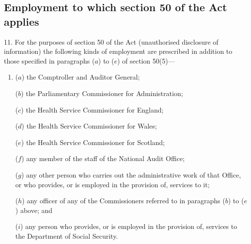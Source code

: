 \documentclass[a4paper,12pt]{article}
\begin{document}
%
%
%

\subsection[11. Employment to which section 50 of the Act applies]{Employment to which section 50 of the Act applies}

11.  For the purposes of section 50 of the Act (unauthorised disclosure of information) the following kinds of employment are prescribed in addition to those specified in paragraphs ($a$) to ($e$) of section 50(5)—
\begin{enumerate}\item[]
($a$) the Comptroller and Auditor General;

($b$) the Parliamentary Commissioner for Administration;

($c$) the Health Service Commissioner for England;

($d$) the Health Service Commissioner for Wales;

($e$) the Health Service Commissioner for Scotland;

($f$) any member of the staff of the National Audit Office;

($g$) any other person who carries out the administrative work of that Office, or who provides, or is employed in the provision of, services to it;

($h$) any officer of any of the Commissioners referred to in paragraphs ($b$) to ($e$) above; and

($i$) any person who provides, or is employed in the provision of, services to the Department of Social Security.
\end{enumerate}

\bigskip
\end{document}
